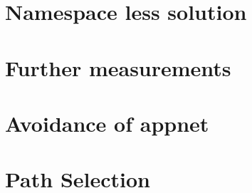 \section{Namespace less solution}

\section{Further measurements}

\section{Avoidance of appnet}

\section{Path Selection}

